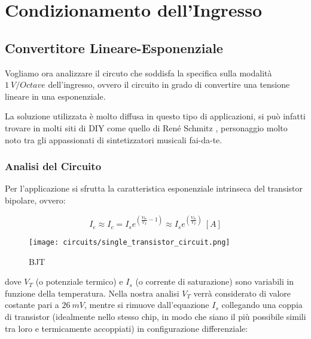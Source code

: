 \chapter{Condizionamento dell'Ingresso}


\section{Convertitore Lineare-Esponenziale}


Vogliamo ora analizzare il circuto che soddisfa la specifica sulla modalità $1\ V/Octave$
dell'ingresso, ovvero il circuito in grado di convertire una tensione lineare in una
esponenziale.

La soluzione utilizzata è molto diffusa in questo tipo di applicazioni, si può infatti
trovare in molti siti di DIY come quello di René Schmitz \cite{expo_converter}, personaggio
molto noto tra gli appassionati di sintetizzatori musicali fai-da-te.


\subsection*{Analisi del Circuito}


Per l'applicazione si sfrutta la caratteristica esponenziale intrinseca del transistor
bipolare, ovvero:

\begin{equation}\label{transistor_current}
    I_e\approx I_c=I_se^{\left(\frac{V_{be}}{V_T}-1\right)}
    \approx I_se^{\left(\frac{V_{be}}{V_T}\right)}\ [A]
\end{equation}

\begin{figure}[H]
    \centering
    \texttt{[image: circuits/single\_transistor\_circuit.png]}
    \caption{BJT}
    \label{bjt}
\end{figure}

dove $V_T$ (o potenziale termico) e $I_s$ (o corrente di saturazione) sono variabili in
funzione della temperatura. Nella nostra analisi $V_T$ verrà considerato di valore costante
pari a $26\ mV$, mentre si rimuove dall'equazione $I_s$ collegando una coppia di transistor
(idealmente nello stesso chip, in modo che siano il più possibile simili tra loro e
termicamente accoppiati) in configurazione differenziale:

